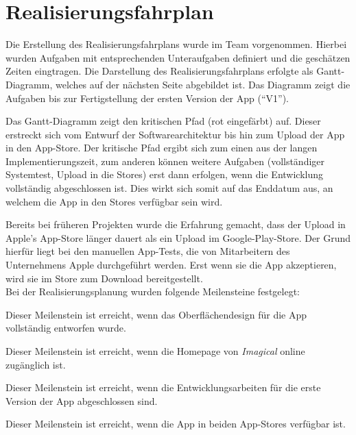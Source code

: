 \chapter{Realisierungsfahrplan}

Die Erstellung des Realisierungsfahrplans wurde im Team vorgenommen.
Hierbei wurden Aufgaben mit entsprechenden Unteraufgaben definiert und die geschätzen Zeiten eingtragen.
Die Darstellung des Realisierungsfahrplans erfolgte als Gantt-Diagramm, welches auf der nächsten Seite abgebildet ist.
Das Diagramm zeigt die Aufgaben bis zur Fertigstellung der ersten Version der App (``V1'').

Das Gantt-Diagramm zeigt den kritischen Pfad (rot eingefärbt) auf.
Dieser erstreckt sich vom Entwurf der Softwarearchitektur bis hin zum Upload der App in den App-Store.
Der kritische Pfad ergibt sich zum einen aus der langen Implementierungszeit, zum anderen können weitere Aufgaben (vollständiger Systemtest, Upload in die Stores) erst dann erfolgen, wenn die Entwicklung vollständig abgeschlossen ist.
Dies wirkt sich somit auf das Enddatum aus, an welchem die App in den Stores verfügbar sein wird.

Bereits bei früheren Projekten wurde die Erfahrung gemacht, dass der Upload in Apple's App-Store länger dauert als ein Upload im Google-Play-Store. Der Grund hierfür liegt bei den manuellen App-Tests, die von Mitarbeitern des Unternehmens Apple durchgeführt werden. Erst wenn sie die App akzeptieren, wird sie im Store zum Download bereitgestellt. \\

Bei der Realisierungsplanung wurden folgende Meilensteine festgelegt:
\begin{description}[leftmargin=!,labelwidth=\widthof{\bfseries KONZEPTION APP UI}]
\item [KONZEPTION APP-UI] Dieser Meilenstein ist erreicht, wenn das Oberflächendesign für die App vollständig entworfen wurde.
\item [WEBSEITE LIVE] Dieser Meilenstein ist erreicht, wenn die Homepage von \textit{Imagical} online zugänglich ist.
\item [APP V1] Dieser Meilenstein ist erreicht, wenn die Entwicklungsarbeiten für die erste Version der App abgeschlossen sind.
\item [APP ONLINE] Dieser Meilenstein ist erreicht, wenn die App in beiden App-Stores verfügbar ist.
\end{description}

 
